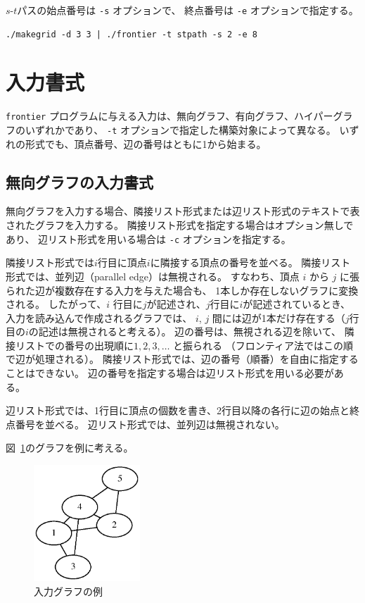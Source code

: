 \documentclass{jsarticle}
\begin{document}
$s$-$t$パスの始点番号は \texttt{-s} オプションで、
終点番号は \texttt{-e} オプションで指定する。

\begin{verbatim}
./makegrid -d 3 3 | ./frontier -t stpath -s 2 -e 8
\end{verbatim}


\section{入力書式}

\texttt{frontier} プログラムに与える入力は、無向グラフ、有向グラフ、ハイパーグラフのいずれかであり、
\texttt{-t} オプションで指定した構築対象によって異なる。
いずれの形式でも、頂点番号、辺の番号はともに1から始まる。

\subsection{無向グラフの入力書式}

無向グラフを入力する場合、隣接リスト形式または辺リスト形式のテキストで表されたグラフを入力する。
隣接リスト形式を指定する場合はオプション無しであり、
辺リスト形式を用いる場合は \texttt{-c} オプションを指定する。

隣接リスト形式では$i$行目に頂点$i$に隣接する頂点の番号を並べる。
隣接リスト形式では、並列辺（parallel edge）は無視される。
すなわち、頂点 $i$ から $j$ に張られた辺が複数存在する入力を与えた場合も、
1本しか存在しないグラフに変換される。
したがって、$i$ 行目に$j$が記述され、$j$行目に$i$が記述されているとき、
入力を読み込んで作成されるグラフでは、
$i$, $j$ 間には辺が1本だけ存在する（$j$行目の$i$の記述は無視されると考える）。
辺の番号は、無視される辺を除いて、
隣接リストでの番号の出現順に$1,2,3,\ldots$ と振られる
（フロンティア法ではこの順で辺が処理される）。
隣接リスト形式では、辺の番号（順番）を自由に指定することはできない。
辺の番号を指定する場合は辺リスト形式を用いる必要がある。

辺リスト形式では、1行目に頂点の個数を書き、2行目以降の各行に辺の始点と終点番号を並べる。
辺リスト形式では、並列辺は無視されない。

図~\ref{fig:graph_example}のグラフを例に考える。

\begin{figure}[h]
  \begin{center}
    \includegraphics[width=40mm]{graph_example.eps}
  \end{center}
  \caption{入力グラフの例}
  \label{fig:graph_example}
\end{figure}
\end{document}
